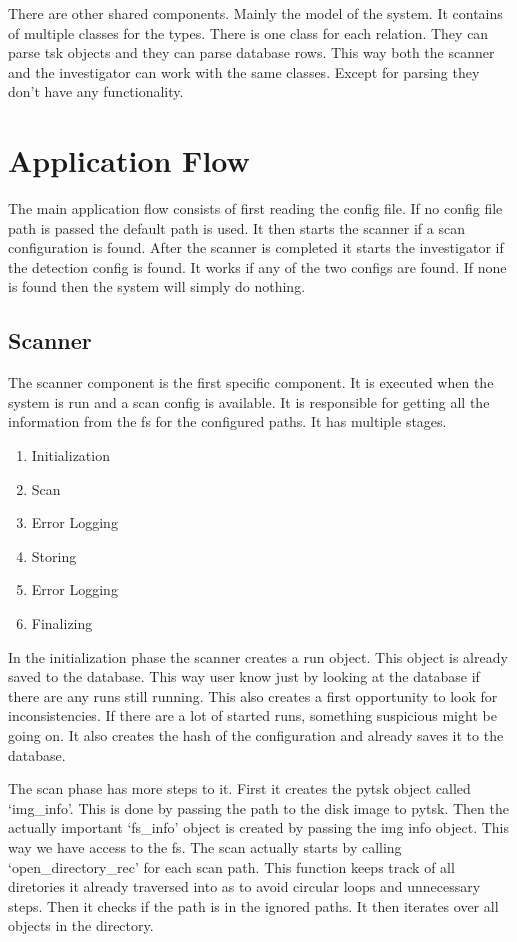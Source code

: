 \documentclass[
	a4paper,					%
	10pt,							%
	twoside,					%
	openright,				%
	notitlepage,			%
	parskip=half,			%
]{scrreprt}					%
\begin{document}
There are other shared components. Mainly the model of the system. It contains of multiple classes for the types. There is one class for each relation. They can parse \gls{tsk} objects and they can parse database rows. This way both the scanner and the investigator can work with the same classes. Except for parsing they don't have any functionality.


\section{Application Flow}
\label{sec:flow}

The main application flow consists of first reading the config file. If no config file path is passed the default path is used. It then starts the scanner if a scan configuration is found. After the scanner is completed it starts the investigator if the detection config is found. It works if any of the two configs are found. If none is found then the system will simply do nothing. 


\subsection{Scanner}
\label{sec:Scanner}

The scanner component is the first specific component. It is executed when the system is run and a scan config is available. It is responsible for getting all the information from the \gls{fs} for the configured paths. It has multiple stages.

\begin{enumerate}
	\item Initialization
	\item Scan
	\item Error Logging
	\item Storing
	\item Error Logging
	\item Finalizing
\end{enumerate}

In the initialization phase the scanner creates a run object. This object is already saved to the database. This way user know just by looking at the database if there are any runs still running. This also creates a first opportunity to look for inconsistencies. If there are a lot of started runs, something suspicious might be going on. It also creates the hash of the configuration and already saves it to the database.

The scan phase has more steps to it. First it creates the \gls{pytsk} object called `img\_info'. This is done by passing the path to the disk image to \gls{pytsk}. Then the actually important `fs\_info' object is created by passing the img info object. This way we have access to the \gls{fs}. The scan actually starts by calling `open\_directory\_rec' for each scan path. This function keeps track of all diretories it already traversed into as to avoid circular loops and unnecessary steps. Then it checks if the path is in the ignored paths. It then iterates over all objects in the directory. 
\end{document}
